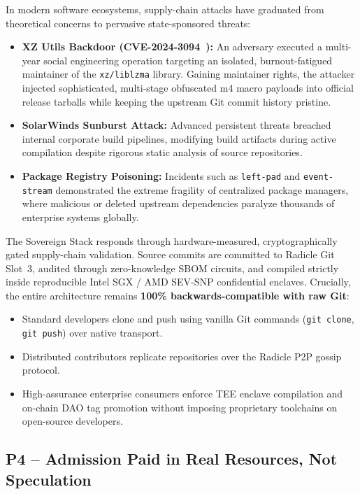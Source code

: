\documentclass[a4paper,11pt,twoside,parskip=half-,headings=small]{scrartcl}
\newcommand{\code}[1]{\texttt{#1}}
\begin{document}
In modern software ecosystems, supply-chain attacks have graduated from theoretical
concerns to pervasive state-sponsored threats:
\begin{itemize}
  \item \textbf{XZ Utils Backdoor (CVE-2024-3094~\cite{cve20243094}):} An adversary executed
a multi-year social engineering operation targeting an isolated, burnout-fatigued
maintainer of the \code{xz/liblzma} library. Gaining maintainer rights, the attacker
injected sophisticated, multi-stage obfuscated m4 macro payloads into official
release tarballs while keeping the upstream Git commit history pristine.
  \item \textbf{SolarWinds Sunburst Attack:} Advanced persistent threats breached internal
corporate build pipelines, modifying build artifacts during active compilation
despite rigorous static analysis of source repositories.
  \item \textbf{Package Registry Poisoning:} Incidents such as \code{left-pad} and
\code{event-stream} demonstrated the extreme fragility of centralized package
managers, where malicious or deleted upstream dependencies paralyze thousands
of enterprise systems globally.
\end{itemize}

The Sovereign Stack responds through hardware-measured, cryptographically gated
supply-chain validation. Source commits are committed to Radicle Git Slot~3,
audited through zero-knowledge SBOM circuits, and compiled strictly inside reproducible
Intel SGX / AMD SEV-SNP confidential enclaves. Crucially, the entire architecture
remains \textbf{100\% backwards-compatible with raw Git}:
\begin{itemize}
  \item Standard developers clone and push using vanilla Git commands (\code{git clone},
\code{git push}) over native transport.
  \item Distributed contributors replicate repositories over the Radicle P2P gossip protocol.
  \item High-assurance enterprise consumers enforce TEE enclave compilation and
on-chain DAO tag promotion without imposing proprietary toolchains on open-source
developers.
\end{itemize}

\subsection{P4 -- Admission Paid in Real Resources, Not Speculation}
\end{document}
